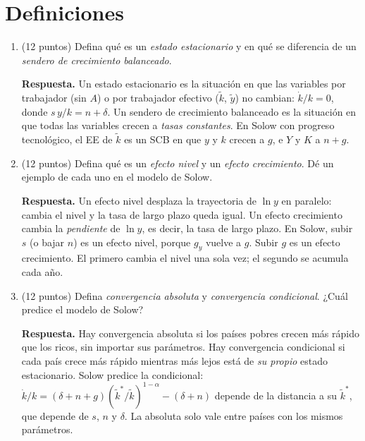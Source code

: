\documentclass[12pt,letterpaper]{article}
\begin{document}
\section*{Definiciones}
\begin{enumerate}[label=\arabic*.,leftmargin=1.6em,itemsep=0.6em,start=8]
\item (12 puntos) Defina qué es un \emph{estado estacionario} y en qué se diferencia de un \emph{sendero de crecimiento balanceado}.
\begin{resp}
\textbf{Respuesta.} Un estado estacionario es la situación en que las variables por trabajador (sin $A$) o por trabajador efectivo ($\tilde k$, $\tilde y$) no cambian: $\dot k/k=0$, donde $s\,y/k=n+\delta$. Un sendero de crecimiento balanceado es la situación en que todas las variables crecen a \emph{tasas constantes}. En Solow con progreso tecnológico, el EE de $\tilde k$ es un SCB en que $y$ y $k$ crecen a $g$, e $Y$ y $K$ a $n+g$.
\end{resp}

\item (12 puntos) Defina qué es un \emph{efecto nivel} y un \emph{efecto crecimiento}. Dé un ejemplo de cada uno en el modelo de Solow.
\begin{resp}
\textbf{Respuesta.} Un efecto nivel desplaza la trayectoria de $\ln y$ en paralelo: cambia el nivel y la tasa de largo plazo queda igual. Un efecto crecimiento cambia la \emph{pendiente} de $\ln y$, es decir, la tasa de largo plazo. En Solow, subir $s$ (o bajar $n$) es un efecto nivel, porque $g_y$ vuelve a $g$. Subir $g$ es un efecto crecimiento. El primero cambia el nivel una sola vez; el segundo se acumula cada año.
\end{resp}

\item (12 puntos) Defina \emph{convergencia absoluta} y \emph{convergencia condicional}. ¿Cuál predice el modelo de Solow?
\begin{resp}
\textbf{Respuesta.} Hay convergencia absoluta si los países pobres crecen más rápido que los ricos, sin importar sus parámetros. Hay convergencia condicional si cada país crece más rápido mientras más lejos está de \emph{su propio} estado estacionario. Solow predice la condicional: $\dot k/k=(\delta+n+g)(\tilde k^*/\tilde k)^{1-\alpha}-(\delta+n)$ depende de la distancia a su $\tilde k^*$, que depende de $s$, $n$ y $\delta$. La absoluta solo vale entre países con los mismos parámetros.
\end{resp}


\end{enumerate}
\end{document}
